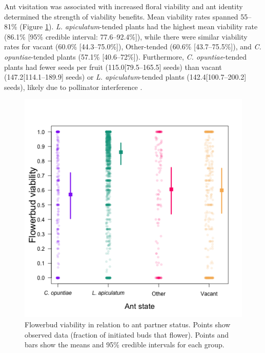 \documentclass[11pt]{article}
\begin{document}
Ant visitation was associated with increased floral viability and ant identity determined the strength of viability benefits.
Mean viability rates spanned 55--81\% (Figure \ref{fig:Viab}).
\textit{L. apiculatum}-tended plants had the highest mean viability rate (86.1\% [95\% credible interval: 77.6--92.4\%]), while there were similar viability rates for vacant (60.0\% [44.3--75.0\%]), Other-tended (60.6\% [43.7--75.5\%]), and \textit{C. opuntiae}-tended plants (57.1\% [40.6--72\%]). 
Furthermore, \textit{C. opuntiae}-tended plants had fewer seeds per fruit (115.0[79.5--165.5] seeds) than vacant (147.2[114.1--189.9] seeds) or \textit{L. apiculatum}-tended plants (142.4[100.7--200.2] seeds), likely due to pollinator interference \citep{Ohm2014}.


\begin{figure}[H]
	\includegraphics[width=0.95\linewidth]{Figures/Viab_v2.png}
	\caption{Flowerbud viability in relation to ant partner status. Points show observed data (fraction of initiated buds that flower). Points and bars show the means and 95\% credible intervals for each group.}
	\label{fig:Viab}
\end{figure}

\end{document}
